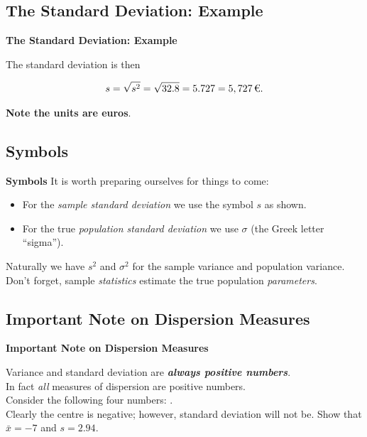 \documentclass[compress]{beamer}        %
\makeatletter
\newcommand{\tcb}{\textcolor{beamer@blendedblue}}
\makeatother
\begin{document}
\subsection{The Standard Deviation: Example}
\begin{frame}{\bf \tcb{The Standard Deviation: Example}}

The standard deviation is then

\begin{align*}
s = \sqrt{s^2} = \sqrt{32.8} = 5.727 = 5,727 \, \text{\texteuro}.\\
\end{align*}

{\bf Note the units are euros}.

\end{frame}


\subsection{Symbols}
\begin{frame}{\bf \tcb{Symbols}}
It is worth preparing ourselves for things to come:\\[0.4cm]

\begin{itemize}\itemsep0.4cm
\item For the \emph{sample standard deviation} we use the symbol $s$ as shown.
\item For the true \emph{population standard deviation} we use $\sigma$ (the Greek letter ``sigma'').\\[0.6cm]
\end{itemize}

Naturally we have $s^2$ and $\sigma^2$ for the sample variance and population variance.\\[0.8cm]

Don't forget, sample \emph{statistics} estimate the true population \emph{parameters}.

\end{frame}


\subsection{Important Note on Dispersion Measures}
\begin{frame}{\bf \tcb{Important Note on Dispersion Measures}}

Variance and standard deviation are {\bf\emph{always positive numbers}}.\\[0.7cm]

In fact \emph{all} measures of dispersion are positive numbers.\\[1.8cm]

Consider the following four  numbers: .\\[0.3cm] Clearly the centre is negative; however, standard deviation will not be. Show that $\bar x = -7$ and $s = 2.94$.

\end{frame}
\end{document}
